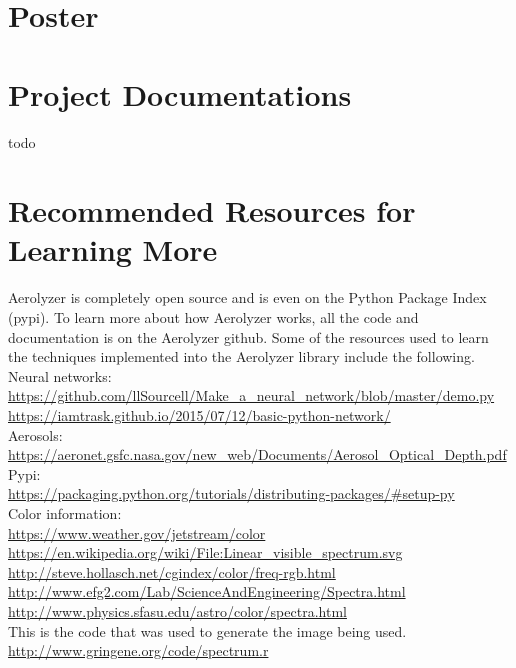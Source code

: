 \documentclass[onecolumn, draftclsnofoot,10pt, compsoc]{IEEEtran}
\begin{document}
\begin{singlespace}
\begin{longtable}{|l|p{0.3\linewidth}|p{0.3\linewidth}|p{0.3\linewidth}|}
			\end{longtable}
	\section{Poster}
		
	\section{Project Documentations}
		todo
	\section{Recommended Resources for Learning More}
		Aerolyzer is completely open source and is even on the Python Package Index (pypi).
		To learn more about how Aerolyzer works, all the code and documentation is on the Aerolyzer github.
		Some of the resources used to learn the techniques implemented into the Aerolyzer library include the following.
		Neural networks:\\
		\url{https://github.com/llSourcell/Make_a_neural_network/blob/master/demo.py} \\
		\url{https://iamtrask.github.io/2015/07/12/basic-python-network/} \\

		Aerosols:\\
		\url{https://aeronet.gsfc.nasa.gov/new_web/Documents/Aerosol_Optical_Depth.pdf} \\

		Pypi:\\
		\url{https://packaging.python.org/tutorials/distributing-packages/#setup-py} \\
		
		Color information: \\
		\url{https://www.weather.gov/jetstream/color} \\
		\url{https://en.wikipedia.org/wiki/File:Linear_visible_spectrum.svg} \\
		\url{http://steve.hollasch.net/cgindex/color/freq-rgb.html} \\
		\url{http://www.efg2.com/Lab/ScienceAndEngineering/Spectra.html} \\
		\url{http://www.physics.sfasu.edu/astro/color/spectra.html} \\

		This is the code that was used to generate the image being used. \\
		\url{http://www.gringene.org/code/spectrum.r} \\



\end{singlespace}
\end{document}
